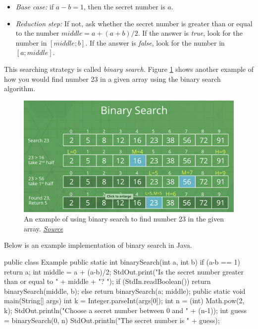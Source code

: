 \begin{itemize}
\item \textit{Base case:} if $a-b = 1$, then the secret number is $a$.
\item \textit{Reduction step:} If not, ask whether the secret number is greater than or equal to the number $middle = a + (a+b)/2$. If the answer is \textit{true}, look for the number in  $[middle; b]$. If the answer is \textit{false}, look for the number in $[a; middle]$.
\end{itemize}

This searching strategy is called \textit{binary search}. Figure \ref{fig:binary} shows another example of how you would find number 23 in a given array using the binary search algorithm.

\begin{figure}
    \centering
    \includegraphics[width=\textwidth]{lectures/images/binary.png}
    \caption{An example of using binary search to find number 23 in the given array. \href{https://www.geeksforgeeks.org/binary-search/}{\textit{Source}}}
    \label{fig:binary}
\end{figure}


Below is an example implementation of binary search in Java.

\begin{code}
public class Example
{
    public static int binarySearch(int a, int b)
	{
	if (a-b == 1) return a;
 	int middle = a + (a-b)/2;
	StdOut.print("Is the secret number greater than or equal to " + middle + "? ");
	if (StdIn.readBoolean())
		return binarySearch(middle, b);
	else
		return binarySearch(a; middle);
	}
	public static void main(String[] args)
{
int k = Integer.parseInt(args[0]);
int n = (int) Math.pow(2, k);
StdOut.println("Choose a secret number between 0 and " + (n-1));
int guess = binarySearch(0, n)
StdOut.println("The secret number is " + guess);
}
}
\end{code}
 
